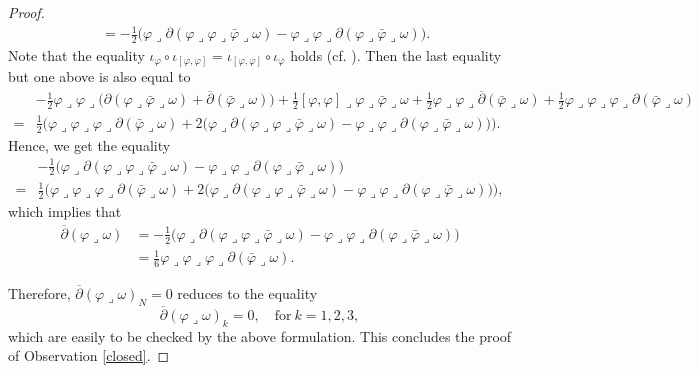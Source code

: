 \documentclass[12pt]{amsart}
\numberwithin{equation}{section}
\renewcommand{\1}{\mathds{1}}
\newcommand{\db}{\overline{\partial}}
\newcommand{\lc}{\lrcorner}
\renewcommand{\>}{\rightarrow}
\newcommand{\p}{\partial}
\def\p{\partial}
\begin{document}
\begin{proof}
\begin{align*}
&= -
\frac{1}{2}\big(\varphi\lc\p(\varphi\lc\varphi\lc\bar\varphi\lc\omega)
-\varphi\lc\varphi\lc\p(\varphi\lc\bar\varphi\lc\omega)\big).
\end{align*}
Note that the equality $\iota_{\varphi} \circ
\iota_{[\varphi,\varphi]} = \iota_{[\varphi,\varphi]} \circ
\iota_{\varphi}$ holds (cf. \cite[Page 361]{C}). Then the last
equality but one above is also equal to \begin{align*} & -
\frac{1}{2} \varphi \lc \varphi \lc\big( \p (\varphi \lc \bar
\varphi \lc \omega) + \db ( \bar \varphi \lc \omega ) \big) +
\frac{1}{2}[\varphi, \varphi] \lc \varphi \lc \bar \varphi \lc
\omega + \frac{1}{2} \varphi \lc \varphi \lc \db (\bar \varphi \lc
\omega)
+ \frac{1}{2} \varphi \lc \varphi \lc \varphi \lc \p (\bar \varphi \lc \omega)\\
=& \frac{1}{2} \Big(
\varphi\lc\varphi\lc\varphi\lc\p(\bar\varphi\lc\omega)
+2\big(\varphi\lc\p(\varphi\lc\varphi\lc\bar\varphi\lc\omega)
-\varphi\lc\varphi\lc\p(\varphi\lc\bar\varphi\lc\omega)\big)\Big).
\end{align*}
Hence, we get the equality
\begin{align*}
&- \frac{1}{2}
\big(\varphi\lc\p(\varphi\lc\varphi\lc\bar\varphi\lc\omega)
-\varphi\lc\varphi\lc\p(\varphi\lc\bar\varphi\lc\omega) \big)\\
=&\frac{1}{2} \Big(
\varphi\lc\varphi\lc\varphi\lc\p(\bar\varphi\lc\omega)
+2\big(\varphi\lc\p(\varphi\lc\varphi\lc\bar\varphi\lc\omega)-\varphi\lc\varphi\lc\p(\varphi\lc\bar\varphi\lc\omega)\big)
\Big),
\end{align*}
which implies that \begin{align*} \db (\varphi \lc \omega) &=
-\frac{1}{2}
\big(\varphi\lc\p(\varphi\lc\varphi\lc\bar\varphi\lc\omega)
- \varphi\lc\varphi\lc\p(\varphi\lc\bar\varphi\lc\omega)\big) \\
& = \frac{1}{6}  \varphi\lc\varphi\lc\varphi\lc\p
(\bar\varphi\lc\omega).
\end{align*}

Therefore, $\db(\varphi\lc \omega)_{N} =0$ reduces to the equality
$$\label{closed-check} \db (\varphi \lc \omega)_k =0, \quad
\textrm{for}\ k=1,2,3,$$ which are easily to be checked by the above
formulation. This concludes the proof of Observation \ref{closed}.


\end{proof}
\end{document}
